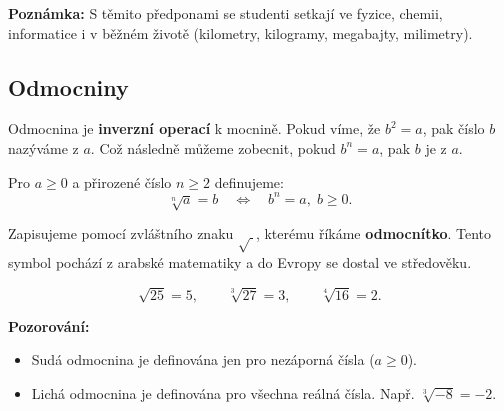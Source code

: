 \documentclass[12pt,a4paper]{article}
\begin{document}
\textbf{Poznámka:} S těmito předponami se studenti setkají ve fyzice, chemii, informatice i v běžném životě (kilometry, kilogramy, megabajty, milimetry).


\subsection{Odmocniny}

Odmocnina je \textbf{inverzní operací} k mocnině.  
Pokud víme, že $b^2 = a$, pak číslo $b$ nazýváme  z $a$.  
Což následně můžeme zobecnit, pokud $b^n = a$, pak $b$ je  z $a$.

\begin{center}
\end{center}


\begin{definitionbox}
Pro $a \geq 0$ a přirozené číslo $n \geq 2$ definujeme:
\[
\sqrt[n]{a} = b \quad \Leftrightarrow \quad b^n = a, \; b \geq 0.
\]
\end{definitionbox}

Zapisujeme pomocí zvláštního znaku $\sqrt{\ }$, kterému říkáme \textbf{odmocnítko}.  
Tento symbol pochází z arabské matematiky a do Evropy se dostal ve středověku.

\begin{examplebox}
\[
\sqrt{25} = 5, \qquad \sqrt[3]{27} = 3, \qquad \sqrt[4]{16} = 2.
\]
\end{examplebox}

\textbf{Pozorování:}  
\begin{itemize}
    \item Sudá odmocnina je definována jen pro nezáporná čísla ($a \geq 0$).  
    \item Lichá odmocnina je definována pro všechna reálná čísla. Např. $\sqrt[3]{-8} = -2$.
\end{itemize}
\end{document}
